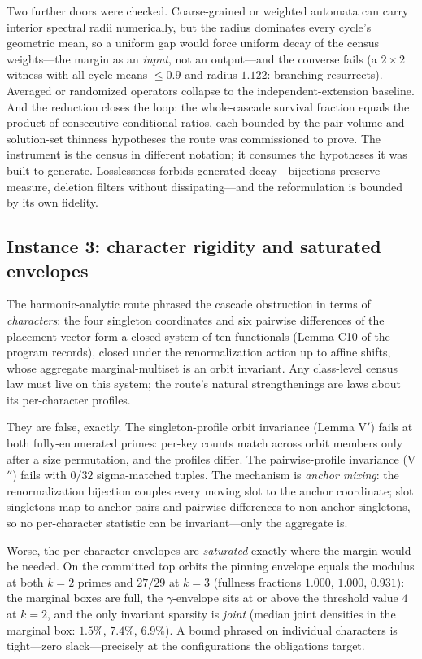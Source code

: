 Two further doors were checked. Coarse-grained or weighted automata can
carry interior spectral radii numerically, but the radius dominates every
cycle's geometric mean, so a uniform gap would force uniform decay of the
census weights---the margin as an \emph{input}, not an output---and the
converse fails (a $2\times2$ witness with all cycle means $\le0.9$ and
radius $1.122$: branching resurrects). Averaged or randomized operators
collapse to the independent-extension baseline. And the reduction closes
the loop: the whole-cascade survival fraction equals the product of
consecutive conditional ratios, each bounded by the pair-volume and
solution-set thinness hypotheses the route was commissioned to prove. The
instrument is the census in different notation; it consumes the
hypotheses it was built to generate. Losslessness forbids generated
decay---bijections preserve measure, deletion filters without
dissipating---and the reformulation is bounded by its own fidelity.

\subsection{Instance 3: character rigidity and saturated envelopes}
\label{sec:tm-char}

The harmonic-analytic route phrased the cascade obstruction in terms of
\emph{characters}: the four singleton coordinates and six pairwise
differences of the placement vector form a closed system of ten
functionals (Lemma C10 of the program records), closed under the
renormalization action up to affine shifts, whose aggregate
marginal-multiset is an orbit invariant. Any class-level census law must
live on this system; the route's natural strengthenings are laws about
its per-character profiles.

They are false, exactly. The singleton-profile orbit invariance (Lemma
V$'$) fails at both fully-enumerated primes: per-key counts match across
orbit members only after a size permutation, and the profiles differ. The
pairwise-profile invariance (V$''$) fails with $0/32$ sigma-matched
tuples. The mechanism is \emph{anchor mixing}: the renormalization
bijection couples every moving slot to the anchor coordinate; slot
singletons map to anchor pairs and pairwise differences to non-anchor
singletons, so no per-character statistic can be invariant---only the
aggregate is.

Worse, the per-character envelopes are \emph{saturated} exactly where the
margin would be needed. On the committed top orbits the pinning envelope
equals the modulus at both $k=2$ primes and $27/29$ at $k=3$ (fullness
fractions $1.000$, $1.000$, $0.931$): the marginal boxes are full, the
$\gamma$-envelope sits at or above the threshold value $4$ at $k=2$, and
the only invariant sparsity is \emph{joint} (median joint densities in
the marginal box: $1.5\%$, $7.4\%$, $6.9\%$). A bound phrased on
individual characters is tight---zero slack---precisely at the
configurations the obligations target.

